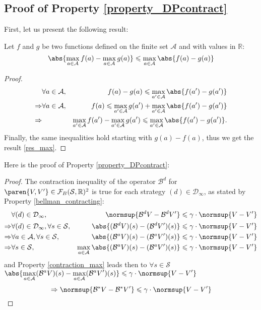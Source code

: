 \subsection{Proof of Property \ref{property_DPcontract}}
\label{property_DPcontract_RETURN}
First, let us present the following result:
\begin{Property}
Let $f$ and $g$ be two functions defined on the finite set $\mathcal{A}$ 
and with values in $\mathbb{R}$:
\begin{equation}
\label{res_max}
 \abs{\max_{a \in \mathcal{A}}f(a) - \max_{a \in \mathcal{A}}g(a)} \leqslant \max_{a \in \mathcal{A}} \abs{f(a)-g(a)}
\end{equation}
\label{contraction_max}
\end{Property}
\begin{proof}
\begin{eqnarray*}
& \forall a \in \mathcal{A}, & f(a) - g(a) \leqslant \max_{a' \in \mathcal{A}} \abs{ f(a') - g(a') } \\
 \Rightarrow & \forall a \in \mathcal{A}, & f(a) \leqslant \max_{a' \in \mathcal{A}} g(a') + \max_{a' \in \mathcal{A}} \abs{f(a')-g(a')}  \\ 
 \Rightarrow &  & \max_{a' \in \mathcal{A}} f(a') - \max_{a' \in \mathcal{A}} g(a') \leqslant \max_{a' \in \mathcal{A}} \abs{f(a')-g(a')}.
\end{eqnarray*}
Finally, the same inequalities hold starting with $g(a) - f(a)$, 
thus we get the result \ref{res_max}.
\end{proof}
Here is the proof of Property \ref{property_DPcontract}:
\begin{proof}
The contraction inequality of the operator $\mathcal{B}^d$ for $\paren{V,V'} \in \mathcal{F}_{B} (\mathcal{S},\mathbb{R})^2$
is true for each strategy $(d) \in \mathcal{D}_{\infty}$, 
as stated by Property \ref{bellman_contracting}:
\begin{eqnarray*}
& \forall (d) \in \mathcal{D}_{\infty}, & \normsup{\mathcal{B}^d V - \mathcal{B}^d V'}   \leqslant \gamma \cdot \normsup{V-V'} \\
\Rightarrow & \forall (d) \in \mathcal{D}_{\infty}, \forall s \in \mathcal{S}, & \abs{(\mathcal{B}^{d} V)(s) - (\mathcal{B}^d V')(s)} \leqslant \gamma \cdot \normsup{V-V'} \\
\Rightarrow & \forall a \in \mathcal{A}, \forall s \in \mathcal{S}, & \abs{(\mathcal{B}^aV)(s) - (\mathcal{B}^aV')(s)} \leqslant \gamma \cdot \normsup{V-V'} \\
\Rightarrow &  \forall s \in \mathcal{S}, & \max_{a \in \mathcal{A}} \abs{(\mathcal{B}^aV)(s) - (\mathcal{B}^aV')(s)} \leqslant \gamma \cdot \normsup{V-V'}
\end{eqnarray*}
and Property \ref{contraction_max} leads then to $\forall s \in \mathcal{S}$ $ \displaystyle \abs{ \max_{a \in \mathcal{A}}(\mathcal{B}^aV)(s) - \max_{a \in \mathcal{A}} (\mathcal{B}^aV')(s)} \leqslant \gamma \cdot \normsup{V-V'} $ \\
\[\Rightarrow \normsup{\mathcal{B}^*V-\mathcal{B}^*V'} \leqslant \gamma \cdot \normsup{V-V'}  \]
\end{proof}





